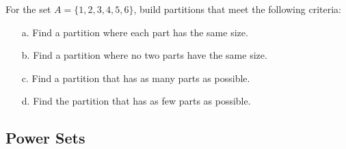 \documentclass[a4paper,12pt]{book}
\newcounter{question}
\begin{document}
        \begin{questionNOGRADE}{\thequestion}

            For the set $A = \{1, 2, 3, 4, 5, 6\}$, build partitions that
            meet the following criteria:

            \begin{enumerate}
                \item[a.]   Find a partition where each part has the same size.

                \item[b.]   Find a partition where no two parts have the same size.

                \item[c.]   Find a partition that has as many parts as possible.

                \item[d.]   Find the partition that has as few parts as possible.
            \end{enumerate}

        \end{questionNOGRADE}

    \newpage
    
    \subsection{Power Sets}
\end{document}
